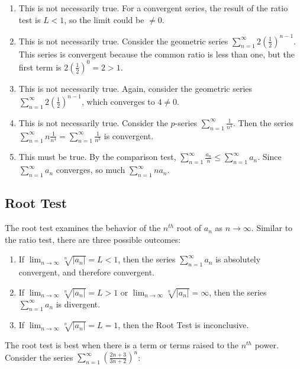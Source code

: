 \begin{Answer}[ref=series2]
\begin{enumerate}
\item This is not necessarily true. For a convergent series, the result of the 
ratio test is $L < 1$, so the limit could be $\neq 0$. 
\item This is not necessarily true. Consider the geometric series $\sum_{n=1}
^\infty 2(\frac{1}{2})^{n-1}$. This series is convergent because the common 
ratio is less than one, but the first term is $2(\frac{1}{2})^0 = 2 > 1$. 
\item This is not necessarily true. Again, consider the geometric series 
$\sum_{n=1}^\infty 2(\frac{1}{2})^{n-1}$, which converges to $4 \neq 0$. 
\item This is not necessarily true. Consider the $p$-series $\sum_{n=1}^
\infty \frac{1}{n^4}$. Then the series $\sum_{n=1}^\infty n \frac{1}{n^4} = 
\sum_{n=1}^\infty \frac{1}{n^3}$ is convergent. 
\item This must be true. By the comparison test, $\sum_{n=1}^\infty 
\frac{a_n}{n} \leq \sum_{n = 1}^\infty a_n$. Since $\sum_{n = 1}^\infty 
a_n$ converges, so much $\sum_{n = 1}^\infty na_n$. 
\end{enumerate}
\end{Answer}

\subsection{Root Test}
The root test examines the behavior of the $n^{th}$ root of 
$a_n$ as $n \to \infty$. Similar to the ratio test, there are three possible 
outcomes:
\begin{enumerate}
\item If $\lim_{n \to \infty} \sqrt[n]{|a_n|} = L < 1$, then the series $\sum
_{n=1}^\infty a_n$ is absolutely convergent, and therefore convergent.
\item If $\lim_{n \to \infty} \sqrt[n]{|a_n|} = L >1$ or $\lim_{n \to \infty} 
\sqrt[n]{|a_n|} = \infty$, then the series $\sum_{n=1}^\infty a_n$ is 
divergent.
\item If $\lim_{n \to \infty} \sqrt[n]{|a_n|} = L = 1$, then the Root Test is 
inconclusive. 
\end{enumerate}

The root test is best when there is a term or terms raised to the $n^{th}$ 
power. Consider the series $\sum_{n=1}^\infty \left( \frac{2n + 3}{3n + 2} 
\right)^n$:

